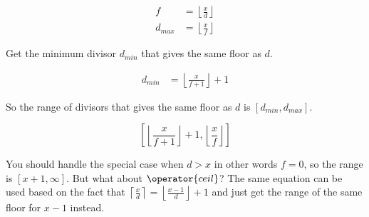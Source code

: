 \documentclass[14pt]{extarticle}
\begin{document}
\begin{align*}
    f &= \left\lfloor\frac x d \right\rfloor\\
    d_{max} &= \left\lfloor\frac x f \right\rfloor
\end{align*}

Get the minimum divisor $d_{min}$ that gives the same floor as $d$.

\begin{align*}
    d_{min} &= \left\lfloor\frac x {f + 1} \right\rfloor + 1
\end{align*}

So the range of divisors that gives the same floor as $d$ is $[d_{min}, d_{max}]$.

$$
    \left[\left\lfloor\frac x {f + 1} \right\rfloor + 1, \left\lfloor\frac x f \right\rfloor\right]
$$

You should handle the special case when $d > x$ in other words $f = 0$, so the range is $[x+1,\infty]$. But what about $\operator{ceil}$?
The same equation can be used based on the fact that $\left\lceil\frac x d \right\rceil = \left\lfloor\frac {x - 1} {d} \right\rfloor + 1$ and just get the range of the same floor for $x - 1$ instead.
\end{document}
